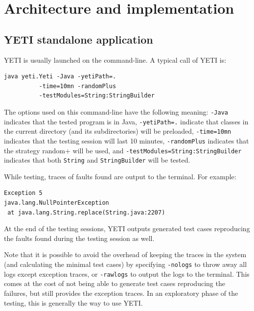 \section{Architecture and implementation}\label{sec:architecture}

\subsection{YETI standalone application}
YETI is usually launched on the command-line. A typical call of YETI is:
{\small
\begin{verbatim}
java yeti.Yeti -Java -yetiPath=. 
          -time=10mn -randomPlus
          -testModules=String:StringBuilder 
\end{verbatim}
}

The options used on this command-line have the following meaning: \texttt{-Java} 
indicates that the tested program is in Java, \texttt{-yetiPath=.} indicate that 
classes in the current directory (and its subdirectories) will be preloaded, 
\texttt{-time=10mn} indicates that the testing session will last 10 minutes, 
\texttt{-randomPlus} indicates that the strategy random+ will be used, and 
\texttt{-testModules=String:StringBuilder} indicates that 
both \texttt{String} and \texttt{StringBuilder} will be tested.

While testing, traces of faults found are output to the terminal. For example:

{\small
\begin{verbatim}
Exception 5
java.lang.NullPointerException
 at java.lang.String.replace(String.java:2207)
\end{verbatim}
}

At the end of the testing sessions, YETI outputs generated test cases reproducing 
the faults found during the testing session as well.

Note that it is possible to avoid the overhead of keeping the 
traces in the system (and calculating the minimal test cases) by specifying 
\texttt{-nologs} to throw away all logs except exception traces, or 
\texttt{-rawlogs} to output the logs to the terminal. This comes at the cost of
not being able to generate test cases reproducing the failures, but still provides 
the exception traces. In an exploratory phase of the testing, this is generally the
way to use YETI.


